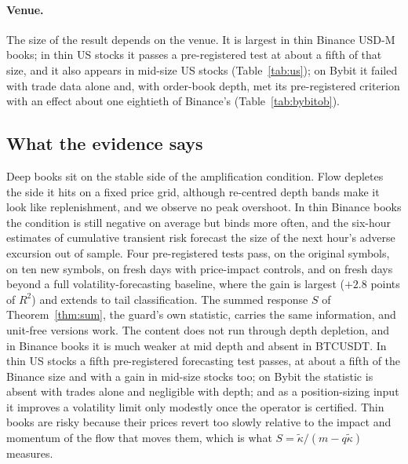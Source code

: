 \paragraph{Venue.} The size of the result depends on the venue. It is largest in thin Binance USD-M books; in thin US stocks it passes a pre-registered test at about a fifth of that size, and it also appears in mid-size US stocks (Table~\ref{tab:us}); on Bybit it failed with trade data alone and, with order-book depth, met its pre-registered criterion with an effect about one eightieth of Binance's (Table~\ref{tab:bybitob}).

\subsection{What the evidence says}\label{sec:thin_summary}
Deep books sit on the stable side of the amplification condition. Flow depletes the side it hits on a fixed price grid, although re-centred depth bands make it look like replenishment, and we observe no peak overshoot. In thin Binance books the condition is still negative on average but binds more often, and the six-hour estimates of cumulative transient risk forecast the size of the next hour's adverse excursion out of sample. Four pre-registered tests pass, on the original symbols, on ten new symbols, on fresh days with price-impact controls, and on fresh days beyond a full volatility-forecasting baseline, where the gain is largest ($+2.8$ points of $R^2$) and extends to tail classification. The summed response $S$ of Theorem~\ref{thm:sum}, the guard's own statistic, carries the same information, and unit-free versions work. The content does not run through depth depletion, and in Binance books it is much weaker at mid depth and absent in BTCUSDT. In thin US stocks a fifth pre-registered forecasting test passes, at about a fifth of the Binance size and with a gain in mid-size stocks too; on Bybit the statistic is absent with trades alone and negligible with depth; and as a position-sizing input it improves a volatility limit only modestly once the operator is certified. Thin books are risky because their prices revert too slowly relative to the impact and momentum of the flow that moves them, which is what $S=\tilde\kappa/(m-q\tilde\kappa)$ measures.
